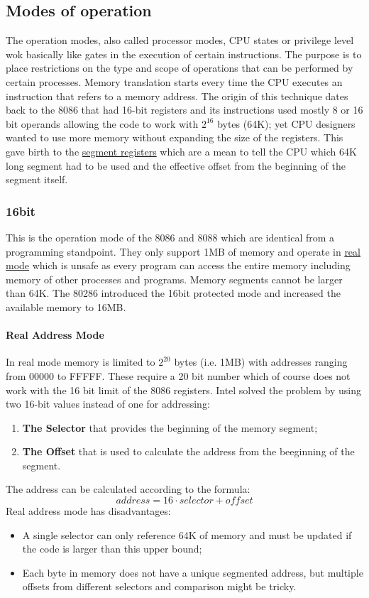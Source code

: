 \subsection{Modes of operation} 
The operation modes, also called processor modes, CPU states or privilege level wok basically like gates in the execution of certain instructions. The purpose is to place restrictions on the type and scope of operations that can be performed by certain processes. Memory translation starts every time the CPU executes an instruction that refers to a memory address. The origin of this technique dates back to the 8086 that had 16-bit registers and its instructions used mostly 8 or 16 bit operands allowing the code to work with $2^{16}$ bytes (64K); yet CPU designers wanted to use more memory without expanding the size of the registers. This gave birth to the \underline{segment registers} which are a mean to tell the CPU which 64K long segment had to be used and the effective offset from the beginning of the segment itself.
\subsubsection{16bit}
This is the operation mode of the 8086 and 8088 which are identical from a programming standpoint. They only support 1MB of memory and operate in \underline{real mode} which is unsafe as every program can access the entire memory including memory of other processes and programs. Memory segments cannot be larger than 64K. The 80286 introduced the 16bit protected mode and increased the available memory to 16MB.
\paragraph{Real Address Mode}
In real mode memory is limited to $2^{20}$ bytes (i.e. 1MB) with addresses ranging from 00000 to FFFFF. These require a 20 bit number which of course does not work with the 16 bit limit of the 8086 registers. Intel solved the problem by using two 16-bit values instead of one for addressing:
\begin{enumerate}
    \item \textbf{The Selector} that provides the beginning of the memory segment;
    \item \textbf{The Offset} that is used to calculate the address from the beeginning of the segment.
\end{enumerate}
The address can be calculated according to the formula:
\begin{equation} 
    address = 16 \cdot selector + offset
\end{equation}
Real address mode has disadvantages:
\begin{itemize} 
    \item A single selector can only reference 64K of memory and must be updated if the code is larger than this upper bound;
    \item Each byte in memory does not have a unique segmented address, but multiple offsets from different selectors and comparison might be tricky.
\end{itemize}
